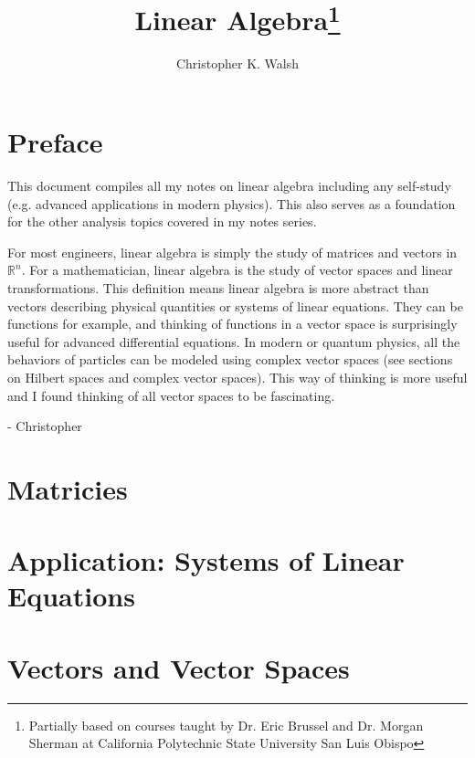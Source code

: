 \documentclass[12pt,openany]{book}
\title{Linear Algebra\thanks{Partially based on courses taught by Dr. Eric Brussel and Dr. Morgan Sherman at California Polytechnic State University San Luis Obispo}}
\author{Christopher K. Walsh}
\theoremstyle{mydefinitionstyle}
\theoremstyle{myexamplestyle}
\theoremstyle{remark}
\begin{document}
\maketitle
\tableofcontents

\newpage
\chapter*{Preface}
This document compiles all my notes on linear algebra including any self-study (e.g. advanced applications in modern physics).
This also serves as a foundation for the other analysis topics covered in my notes series.

For most engineers, linear algebra is simply the study of matrices and vectors in \( \mathbb{R}^n \).
For a mathematician, linear algebra is the study of vector spaces and linear transformations.
This definition means linear algebra is more abstract than vectors describing physical quantities or systems of linear equations.
They can be functions for example, and thinking of functions in a vector space is surprisingly useful for advanced differential equations.
In modern or quantum physics, all the behaviors of particles can be modeled using complex vector spaces (see sections on Hilbert spaces and complex vector spaces).
This way of thinking is more useful and I found thinking of all vector spaces to be fascinating.

- Christopher


\chapter{Matricies}


\chapter{Application: Systems of Linear Equations}


\chapter{Vectors and Vector Spaces}

\end{document}
